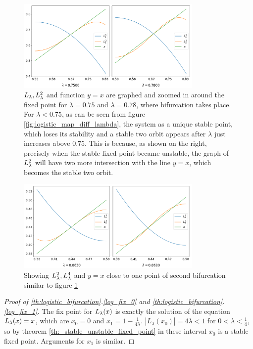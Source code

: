 \begin{figure}[htbp]
	\centering
	\includegraphics[width=0.8\textwidth]{./figures/logistic_map_around_bifurcation.png}
	\caption{
		$L_{\lambda}, L_{\lambda}^2$ and function $y=x$ are graphed and zoomed in around the fixed point for $\lambda = 0.75$ and $\lambda = 0.78$, where bifurcation takes place.
		For $\lambda < 0.75$, as can be seen from figure \ref{fig:logistic_map_diff_lambda}, the system as a unique stable point,
		which loses its stability and a stable two orbit appears after $\lambda$ just increases above $0.75$.
		This is because, as shown on the right, precisely when the stable fixed point became unstable, the graph of $L_{\lambda}^2$ will have two more intersection with the line $y=x$, which becomes the stable two orbit.
	}
	\label{fig:point_of_bifurcation1}
\end{figure}

\begin{figure}[htbp]
	\centering
	\includegraphics[width=0.8\textwidth]{./figures/logistic_map_around_bifurcation_2.png}
	\caption{Showing $L_{\lambda}^2, L_{\lambda}^4$ and $y=x$ close to one point of second bifurcation similar to figure \ref{fig:point_of_bifurcation1}}
	\label{fig:point_of_bifurcation2}
\end{figure}

\begin{proof}[Proof of \ref{th:logistic_bifurcation}.\ref{log_fix_0} and \ref{th:logistic_bifurcation}.\ref{log_fix_1}]
	The fix point for $L_{\lambda}(x)$ is exactly the solution of the equation $L_{\lambda}(x) = x$, which are $x_0 = 0$ and $x_1 = 1 - \frac{1}{4\lambda}$. 
	$|L_{\lambda}(x_0) | = 4 \lambda < 1$ for $0 < \lambda < \frac{1}{4}$, so by theorem \ref{th:_stable_unstable_fixed_point} in these interval $x_0$ is a stable fixed point.
	Arguments for $x_1$ is similar.
\end{proof}

